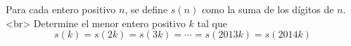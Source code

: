 Para cada entero positivo $n$, se define $s(n)$ como la suma de los dígitos de $n$.<br>
Determine el menor entero positivo $k$ tal que
\[ s(k) = s(2k) = s(3k) = \cdots = s(2013k) = s(2014k) \]

